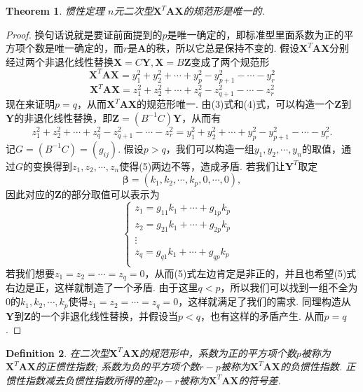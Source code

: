 \documentclass{article}
\newtheorem{theorem}{Theorem}[section]
\newtheorem{definition}[theorem]{Definition}
\newcommand{\mbf}[1]{\bm{#1}}
\begin{document}
\begin{theorem}
\rm {\color{red} 惯性定理} $n$元二次型$\mbf{X}^T\mbf{A}\mbf{X}$的规范形是唯一的. 
\end{theorem}

\begin{proof}
\rm 换句话说就是要证前面提到的$p$是唯一确定的，即标准型里面系数为正的平方项个数是唯一确定的，而$r$是$\mbf{A}$的秩，所以它总是保持不变的. 假设$\mbf{X}^T\mbf{A}\mbf{X}$分别经过两个非退化线性替换$\mbf{X} = C \mbf{Y}, \mbf{X} = B\mbf{Z}$变成了两个规范形
\begin{equation}
\mbf{X}^T\mbf{A}\mbf{X} = y_1^2+y_2^2 + \cdots + y_p^2 - y_{p+1}^2 - \cdots - y_{r}^2
\end{equation}
\begin{equation}
\mbf{X}^T\mbf{A}\mbf{X} = z_1^2+z_2^2 + \cdots + z_q^2 - z_{q+1}^2 - \cdots - z_{r}^2
\end{equation} 
现在来证明$p=q$，从而$\mbf{X}^T\mbf{A}\mbf{X}$的规范形唯一. 由(3)式和(4)式，可以构造一个$\mbf{Z}$到$\mbf{Y}$的非退化线性替换，即$\mbf{Z} =(B^{-1}C)\mbf{Y}$，从而有
\begin{equation}
z_1^2+z_2^2 + \cdots + z_q^2 - z_{q+1}^2 - \cdots - z_{r}^2 = y_1^2+y_2^2 + \cdots + y_p^2 - y_{p+1}^2 - \cdots - y_{r}^2.
\end{equation}
记$G = (B^{-1}C)=(g_{ij})$. 假设$p > q$，我们可以构造一组$y_1,y_2,\cdots,y_n$的取值，通过$G$的变换得到$z_1,z_2,\cdots,z_n$使得(5)两边不等，造成矛盾. 若我们让$\mbf{Y}^T$取定
$$
\mbf{\beta} = (k_1,k_2,\cdots,k_p,0,\cdots,0),
$$
因此对应的$\mbf{Z}$的部分取值可以表示为
$$
\left\{
\begin{array}{cl}
z_1 = g_{11}k_1+ \cdots + g_{1p}k_p & \\
z_2 = g_{21}k_1+ \cdots + g_{2p}k_p &\\ 
\vdots& \\
z_q = g_{q1}k_1+ \cdots + g_{qp}k_p &\\ 
\end{array}
\right.
$$
若我们想要$z_1 = z_2 = \cdots = z_q = 0$，从而(5)式左边肯定是非正的，并且也希望(5)式右边是正，这样就制造了一个矛盾. 由于这里$q < p$，所以我们可以找到一组不全为0的$k_1,k_2,\cdots,k_p$使得$z_1 = z_2 = \cdots = z_q = 0$，这样就满足了我们的需求. 同理构造从$\mbf{Y}$到$\mbf{Z}$的一个非退化线性替换，并假设当$p < q$，也有这样的矛盾产生. 从而$p = q$. 
\end{proof}


\begin{definition}
\rm  在二次型$\mbf{X}^T\mbf{A}\mbf{X}$的规范形中，系数为正的平方项个数$p$被称为$\mbf{X}^T\mbf{A}\mbf{X}$的{\color{red}正惯性指数}; 系数为负的平方项个数$r-p$被称为$\mbf{X}^T\mbf{A}\mbf{X}$的{\color{red}负惯性指数}. 正惯性指数减去负惯性指数所得的差$2p-r$被称为$\mbf{X}^T\mbf{A}\mbf{X}$的{\color{red}符号差}.
\end{definition}
\end{document}
